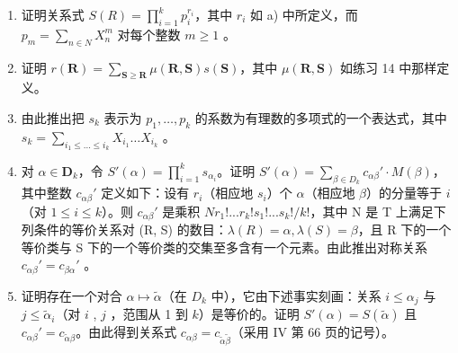 \begin{enumerate}
\def\labelenumi{\alph{enumi})}
\setcounter{enumi}{1}
\item
  证明关系式 \(S(R) = \prod_{i=1}^{k} p_i^{r_i}\)，其中 \(r_i\) 如 a) 中所定义，而 \(p_m = \sum_{n \in N} X_n^m\) 对每个整数 \(m \geqslant 1\) 。
\item
  证明 \(r(\mathbf{R}) = \sum_{\mathbf{S} \geqslant \mathbf{R}} \mu(\mathbf{R}, \mathbf{S}) s(\mathbf{S})\)，其中 \(\mu(\mathbf{R}, \mathbf{S})\) 如练习 14 中那样定义。
\item
  由此推出把 \(s_k\) 表示为 \(p_1, \ldots, p_k\) 的系数为有理数的多项式的一个表达式，其中 \(s_k = \sum_{i_1 \leq \ldots \leq i_k} X_{i_1} \ldots X_{i_k}\) 。
\item
  对 \(\alpha \in \mathbf{D}_k\)，令 \(S'(\alpha) = \prod_{i=1}^{k} s_{\alpha_i}\)。证明 \(S'(\alpha) = \sum_{\beta \in D_k} c_{\alpha\beta}' \cdot M(\beta)\)，其中整数 \(c_{\alpha\beta}'\) 定义如下：设有 \(r_i\)（相应地 \(s_i\)）个 \(\alpha\)（相应地 \(\beta\)）的分量等于 \(i\)（对 \(1 \leqslant i \leqslant k\)）。则 \(c_{\alpha\beta}'\) 是乘积 \(Nr_1!... r_k!s_1!... s_k!/k!\)，其中 N 是 T 上满足下列条件的等价关系对 (R, S) 的数目：\(\lambda(R) = \alpha, \lambda(S) = \beta\)，且 R 下的一个等价类与 S 下的一个等价类的交集至多含有一个元素。由此推出对称关系 \(c_{\alpha\beta}' = c_{\beta\alpha}'\) 。
\item
  证明存在一个对合 \(\alpha \mapsto \tilde{\alpha}\)（在 \(D_k\) 中），它由下述事实刻画：关系 \(i \leqslant \alpha_j\) 与 \(j \leqslant \tilde{\alpha}_i\)（对 \(i\) , \(j\) ，范围从 1 到 \(k\)）是等价的。证明 \(S'(\alpha) = S(\tilde{\alpha})\) 且 \(c_{\alpha\beta}' = c_{\tilde{\alpha}\beta}\)。由此得到关系式 \(c_{\alpha\beta} = c_{\tilde{\alpha}\tilde{\beta}}\)（采用 IV 第 66 页的记号）。
\end{enumerate}

